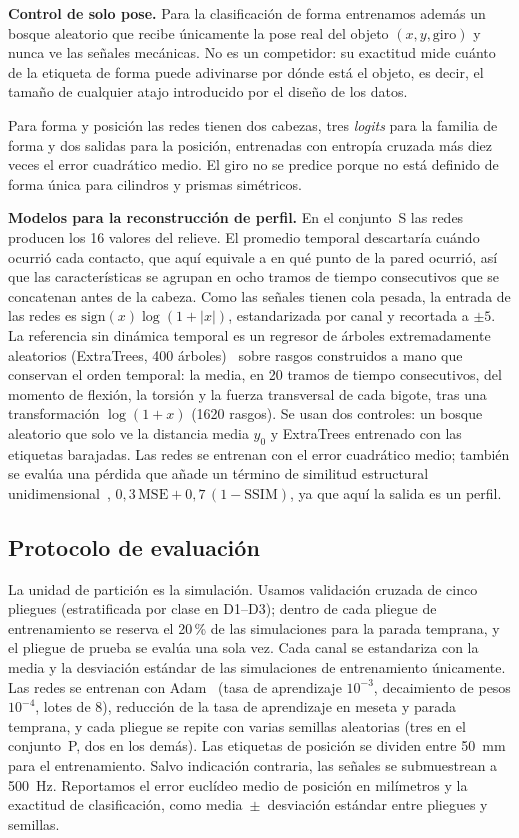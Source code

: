 \documentclass[conference]{IEEEtran}
\begin{document}
\textbf{Control de solo pose.} Para la clasificación de forma entrenamos además un bosque aleatorio que recibe únicamente la pose real del objeto $(x,y,\text{giro})$ y nunca ve las señales mecánicas. No es un competidor: su exactitud mide cuánto de la etiqueta de forma puede adivinarse por dónde está el objeto, es decir, el tamaño de cualquier atajo introducido por el diseño de los datos.

Para forma y posición las redes tienen dos cabezas, tres \emph{logits} para la familia de forma y dos salidas para la posición, entrenadas con entropía cruzada más diez veces el error cuadrático medio. El giro no se predice porque no está definido de forma única para cilindros y prismas simétricos.

\textbf{Modelos para la reconstrucción de perfil.} En el conjunto~S las redes producen los 16 valores del relieve. El promedio temporal descartaría cuándo ocurrió cada contacto, que aquí equivale a en qué punto de la pared ocurrió, así que las características se agrupan en ocho tramos de tiempo consecutivos que se concatenan antes de la cabeza. Como las señales tienen cola pesada, la entrada de las redes es $\mathrm{sign}(x)\log(1+|x|)$, estandarizada por canal y recortada a $\pm5$. La referencia sin dinámica temporal es un regresor de árboles extremadamente aleatorios (ExtraTrees, 400 árboles)~\cite{geurts2006} sobre rasgos construidos a mano que conservan el orden temporal: la media, en 20 tramos de tiempo consecutivos, del momento de flexión, la torsión y la fuerza transversal de cada bigote, tras una transformación $\log(1+x)$ (1620 rasgos). Se usan dos controles: un bosque aleatorio que solo ve la distancia media $y_0$ y ExtraTrees entrenado con las etiquetas barajadas. Las redes se entrenan con el error cuadrático medio; también se evalúa una pérdida que añade un término de similitud estructural unidimensional~\cite{wang2004}, $0{,}3\,\mathrm{MSE}+0{,}7\,(1-\mathrm{SSIM})$, ya que aquí la salida es un perfil.

\subsection{Protocolo de evaluación}
La unidad de partición es la simulación. Usamos validación cruzada de cinco pliegues (estratificada por clase en D1--D3); dentro de cada pliegue de entrenamiento se reserva el 20\,\% de las simulaciones para la parada temprana, y el pliegue de prueba se evalúa una sola vez. Cada canal se estandariza con la media y la desviación estándar de las simulaciones de entrenamiento únicamente. Las redes se entrenan con Adam~\cite{kingma2015} (tasa de aprendizaje $10^{-3}$, decaimiento de pesos $10^{-4}$, lotes de 8), reducción de la tasa de aprendizaje en meseta y parada temprana, y cada pliegue se repite con varias semillas aleatorias (tres en el conjunto~P, dos en los demás). Las etiquetas de posición se dividen entre 50~mm para el entrenamiento. Salvo indicación contraria, las señales se submuestrean a 500~Hz. Reportamos el error euclídeo medio de posición en milímetros y la exactitud de clasificación, como media~$\pm$~desviación estándar entre pliegues y semillas.
\end{document}
